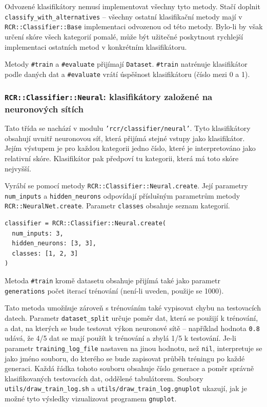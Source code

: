 \documentclass[a4paper]{article}
\begin{document}
Odvozené klasifikátory nemusí implementovat všechny tyto metody.
Stačí doplnit \texttt{classify\_with\_alternatives} -- všechny ostatní
klasifikační metody mají v \texttt{RCR::Classifier::Base} implementaci
odvozenou od této metody. Bylo-li by však určení skóre všech kategorií
pomalé, může být užitečné poskytnout rychlejší implementaci ostatních
metod v konkrétním klasifikátoru.

Metody \texttt{\#train} a \texttt{\#evaluate} přijímají \texttt{Dataset}.
\texttt{\#train} natrénuje klasifikátor podle daných dat a \texttt{\#evaluate}
vrátí úspěšnost klasifikátoru (číslo mezi 0 a 1).

\subsubsection{\texttt{RCR::Classifier::Neural}: klasifikátory založené na
neuronových sítích}
Tato třída se nachází v modulu \texttt{'rcr/classifier/neural'}.
Tyto klasifikátory obsahují uvnitř neuronovou síť, která přijímá stejné vstupy
jako klasifikátor. Jejím výstupem je pro každou kategorii jedno číslo, které
je interpretováno jako relativní skóre. Klasifikátor pak předpoví tu kategorii,
která má toto skóre nejvyšší.

Vyrábí se pomocí metody \texttt{RCR::Classifier::Neural.create}. Její parametry
\texttt{num\_inputs} a \texttt{hidden\_neurons} odpovídají příslušným parametrům
metody \texttt{RCR::NeuralNet.create}. Parametr \texttt{classes} obsahuje seznam
kategorií.
\begin{lstlisting}
classifier = RCR::Classifier::Neural.create(
  num_inputs: 3,
  hidden_neurons: [3, 3],
  classes: [1, 2, 3]
)
\end{lstlisting}

Metoda \texttt{\#train} kromě datasetu obsahuje přijímá také jako parametr
\texttt{generations} počet iterací trénování (není-li uveden, použije se 1000).

Tato metoda umožňuje zároveň s trénováním také vypisovat chybu na testovacích
datech. Parametr \texttt{dataset\_split} určuje poměr dat, která se použijí k
trénování, a dat, na kterých se bude testovat výkon neuronové sítě -- například
hodnota \texttt{0.8} udává, že 4/5 dat se mají použít k trénování a zbylá 1/5 k
testování.
Je-li parametr \texttt{training\_log\_file} nastaven na jinou hodnotu, než
\texttt{nil}, interpretuje se jako jméno souboru, do kterého se bude zapisovat
průběh tréningu po každé generaci. Každá řádka tohoto souboru
obsahuje číslo generace a poměr správně klasifikovaných testovacích dat,
oddělené tabulátorem. Soubory \texttt{utils/draw\_train\_log.sh} a
\texttt{utils/draw\_train\_log.gnuplot} ukazují, jak je možné tyto výsledky
vizualizovat programem \texttt{gnuplot}.
\end{document}
